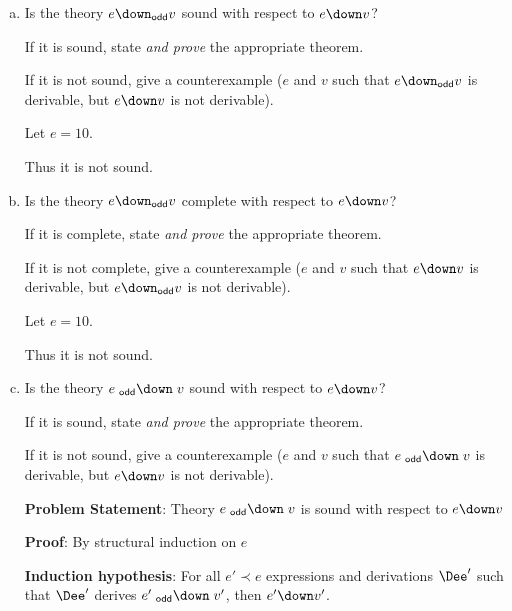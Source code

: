 \begin{enumerate}[(a)]
\item Is the theory $e \downodd v$ sound with respect to $e \down v$?

  If it is sound, state \emph{and prove} the appropriate theorem.

  \checkmark If it is not sound, give a counterexample ($e$ and $v$ such that
  $e \downodd v$ is derivable, but $e \down v$ is not derivable).
  
  Let $e=10$.
  
  \begin{llproof}
  \end{llproof}
  
  Thus it is not sound.

\item Is the theory $e \downodd v$ complete with respect to $e \down v$?

  If it is complete, state \emph{and prove} the appropriate theorem.

  \checkmark If it is not complete, give a counterexample ($e$ and $v$ such that
  $e \down v$ is derivable, but $e \downodd v$ is not derivable).
  
  Let $e=10$.
  
  \begin{llproof}
  \end{llproof}
  
  Thus it is not sound.

\item Is the theory $e \odddown v$ sound with respect to $e \down v$?

  \checkmark If it is sound, state \emph{and prove} the appropriate theorem.

  If it is not sound, give a counterexample ($e$ and $v$ such that
  $e \odddown v$ is derivable, but $e \down v$ is not derivable).
  
  \textbf{Problem Statement}: Theory $e \odddown v$ is sound with respect to $e \down v$
  
  \textbf{Proof}: By structural induction on $e$
  
  \textbf{Induction hypothesis}: For all $e'\prec{e}$ expressions and derivations $\Dee'$ such that $\Dee'$ derives $e'\odddown v'$, then $e'\down v'$.
  \vspace{2ex}
  

\end{enumerate}
